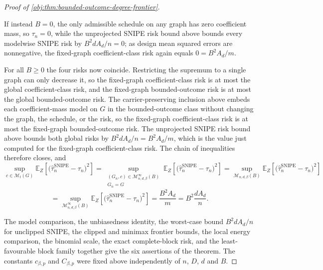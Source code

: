 \documentclass[11pt]{article}
\begin{document}
\begin{proof}[Proof of \cref{obj:thm:bounded-outcome-degree-frontier}]
\begin{enumerate}
If instead \(B=0\), the only admissible schedule on any graph has zero
coefficient mass, so \(\tau_n=0\), while the unprojected SNIPE risk bound above
bounds every modelwise SNIPE risk
by \(B^2dA_d/n=0\); as design mean squared errors are nonnegative, the
fixed-graph coefficient-class risk again equals \(0=B^2A_d/m\).

For all \(B\ge0\) the four risks now coincide.  Restricting the supremum to a
single graph can only decrease it, so the fixed-graph coefficient-class risk is
at most the global coefficient-class risk, and the fixed-graph bounded-outcome
risk is at most the global bounded-outcome risk.  The carrier-preserving
inclusion above embeds each coefficient-mass model on \(G\) in the
bounded-outcome class without changing the graph, the schedule, or the risk, so
the fixed-graph coefficient-class risk is at most the fixed-graph
bounded-outcome risk.  The unprojected SNIPE risk bound above bounds both global
risks by
\(B^2dA_d/n=B^2A_d/m\), which is the value just computed for the fixed-graph
coefficient-class risk.  The chain of inequalities therefore closes, and
\[
\sup_{c\in\mathcal M_t(G)}
\mathbb E_Z\!\left[\bigl(\widehat\tau_n^{\mathrm{SNIPE}}-\tau_n\bigr)^2\right]
=
\sup_{\substack{(G_n,c)\in\mathcal M_{n,d,\beta}^{\infty}(B)\\ G_n=G}}
\mathbb E_Z\!\left[\bigl(\widehat\tau_n^{\mathrm{SNIPE}}-\tau_n\bigr)^2\right]
=
\sup_{\mathcal M_{n,d,\beta}(B)}
\mathbb E_Z\!\left[\bigl(\widehat\tau_n^{\mathrm{SNIPE}}-\tau_n\bigr)^2\right]
\]
\[
=
\sup_{\mathcal M_{n,d,\beta}^{\infty}(B)}
\mathbb E_Z\!\left[\bigl(\widehat\tau_n^{\mathrm{SNIPE}}-\tau_n\bigr)^2\right]
=
\frac{B^2A_d}{m}
=
B^2\frac{dA_d}{n}.
\]
\end{enumerate}
The model comparison, the unbiasedness identity, the worst-case bound
\(B^2dA_d/n\) for unclipped SNIPE, the clipped and minimax frontier bounds, the
local energy comparison, the binomial scale, the exact complete-block risk, and
the least-favourable block family together give the six assertions of the
theorem.  The constants \(c_{\beta,p}\) and \(C_{\beta,p}\) were fixed above
independently of \(n\), \(D\), \(d\) and \(B\).
\end{proof}
\end{document}
